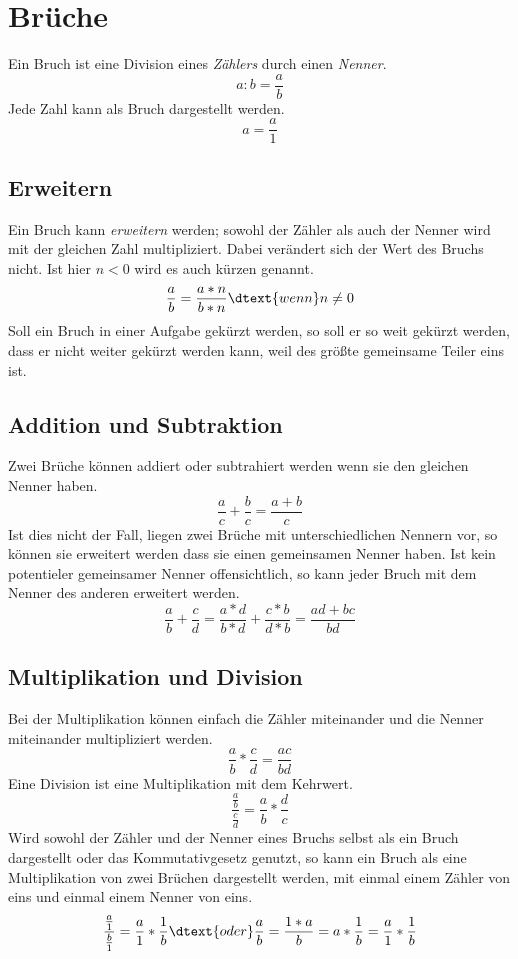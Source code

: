 \documentclass{article}
\begin{document}
\section{Brüche}
Ein Bruch ist eine Division eines \emph{Zählers} durch einen \emph{Nenner}.
\[
 a : b = \frac{a}{b}
\]
Jede Zahl kann als Bruch dargestellt werden.
\[
 a = \frac{a}{1}
\]

\subsection{Erweitern}
Ein Bruch kann \emph{erweitern} werden; sowohl der Zähler als auch der Nenner wird mit der gleichen Zahl multipliziert. Dabei verändert sich der Wert des Bruchs nicht. Ist hier $n<0$ wird es auch kürzen genannt.
\[
 \frac{a}{b} = \frac{a*n}{b*n} \dtext{wenn} n \ne 0
\]
Soll ein Bruch in einer Aufgabe gekürzt werden, so soll er so weit gekürzt werden, dass er nicht weiter gekürzt werden kann, weil des größte gemeinsame Teiler eins ist.

\subsection{Addition und Subtraktion}
Zwei Brüche können addiert oder subtrahiert werden wenn sie den gleichen Nenner haben.
\[
 \frac{a}{c} + \frac{b}{c} = \frac{a+b}{c}
\]
Ist dies nicht der Fall, liegen zwei Brüche mit unterschiedlichen Nennern vor, so können sie erweitert werden dass sie einen gemeinsamen Nenner haben. Ist kein potentieler gemeinsamer Nenner offensichtlich, so kann jeder Bruch mit dem Nenner des anderen erweitert werden.
\[
 \frac{a}{b} + \frac{c}{d} = \frac{a*d}{b*d} + \frac{c*b}{d*b} = \frac{ad+bc}{bd}
\]

\subsection{Multiplikation und Division}
Bei der Multiplikation können einfach die Zähler miteinander und die Nenner miteinander multipliziert werden.
\[
 \frac{a}{b} * \frac{c}{d} = \frac{ac}{bd}
\]
Eine Division ist eine Multiplikation mit dem Kehrwert.
\[
 \frac{\frac{a}{b}}{\frac{c}{d}} = \frac{a}{b} * \frac{d}{c}
\]
Wird sowohl der Zähler und der Nenner eines Bruchs selbst als ein Bruch dargestellt oder das Kommutativgesetz genutzt, so kann ein Bruch als eine Multiplikation von zwei Brüchen dargestellt werden, mit einmal einem Zähler von eins und einmal einem Nenner von eins.
\[
 \frac{\frac{a}{1}}{\frac{b}{1}} = \frac{a}{1} * \frac{1}{b}
 \dtext{oder}
 \frac{a}{b} = \frac{1*a}{b} = a * \frac{1}{b} = \frac{a}{1} * \frac{1}{b}
\]
\end{document}
